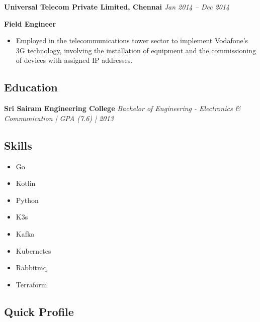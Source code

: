 \documentclass[11pt, oneside]{article}
\begin{document}
\medskip

\textbf{Universal Telecom Private Limited, Chennai}
\hfill
\textit{Jan 2014 – Dec 2014}
								 
\textbf{Field Engineer}

\begin{itemize}
  \item Employed in the telecommunications tower sector to implement Vodafone's 3G technology, involving the installation of equipment and the commissioning of devices with assigned IP addresses.

\end{itemize}

\medskip
\subsection*{Education}
\textbf{Sri Sairam Engineering College}
\hfill
\textit{Bachelor of Engineering - Electronics \& Communication | GPA (7.6) | 2013}

\medskip
\subsection*{Skills}
\begin{multicols}{3}
  \begin{itemize}
    \item Go
    \item Kotlin
    \item Python
    \item K3s
    \item Kafka
    \item Kubernetes
    \item Rabbitmq
    \item Terraform 
  \end{itemize}
\end{multicols}

\medskip
\medskip
\subsection*{Quick Profile}
\begin{figure}[h!]
\centering
{}
\hspace{4cm}
\end{figure}
\end{document}
